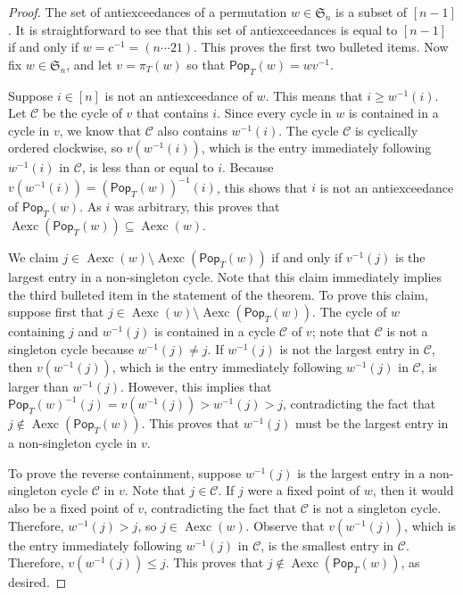 \documentclass[ALCO,ThmDefs,Unicode,epreuves]{cedram}
\newcommand{\pop}{\mathsf{Pop}}
\DeclareMathOperator{\Aexc}{Aexc}
\begin{document}
\begin{proof}
The set of antiexceedances of a permutation $w\in \mathfrak S_n$ is a subset of $[n-1]$. It is straightforward to see that this set of antiexceedances is equal to $[n-1]$ if and only if $w=c^{-1}=(n\cdots 21)$. This proves the first two bulleted items. Now fix $w\in \mathfrak S_n$, and let $v=\pi_T(w)$ so that $\pop_T(w)=wv^{-1}$.

Suppose $i\in[n]$ is not an antiexceedance of $w$. This means that $i\geq w^{-1}(i)$. Let $\mathcal C$ be the cycle of $v$ that contains $i$. Since every cycle in $w$ is contained in a cycle in $v$, we know that $\mathcal C$ also contains $w^{-1}(i)$. The cycle $\mathcal C$ is cyclically ordered clockwise, so $v(w^{-1}(i))$, which is the entry immediately following $w^{-1}(i)$ in $\mathcal C$, is less than or equal to $i$. Because $v(w^{-1}(i))=(\pop_T(w))^{-1}(i)$, this shows that $i$ is not an antiexceedance of $\pop_T(w)$. As $i$ was arbitrary, this proves that $\Aexc(\pop_T(w))\subseteq\Aexc(w)$. 

We claim $j\in\Aexc(w)\setminus\Aexc(\pop_T(w))$ if and only if $v^{-1}(j)$ is the largest entry in a non-singleton cycle. Note that this claim immediately implies the third bulleted item in the statement of the theorem. To prove this claim, suppose first that $j\in\Aexc(w)\setminus\Aexc(\pop_T(w))$. The cycle of $w$ containing $j$ and $w^{-1}(j)$ is contained in a cycle $\mathcal C$ of $v$; note that $\mathcal C$ is not a singleton cycle because $w^{-1}(j)\neq j$. If $w^{-1}(j)$ is not the largest entry in $\mathcal C$, then $v(w^{-1}(j))$, which is the entry immediately following $w^{-1}(j)$ in $\mathcal C$, is larger than $w^{-1}(j)$. However, this implies that $\pop_T(w)^{-1}(j)=v(w^{-1}(j))>w^{-1}(j)>j$, contradicting the fact that $j\not\in\Aexc(\pop_T(w))$. This proves that $w^{-1}(j)$ must be the largest entry in a non-singleton cycle in $v$. 

To prove the reverse containment, suppose $w^{-1}(j)$ is the largest entry in a non-singleton cycle $\mathcal C$ in $v$. Note that $j\in\mathcal C$. If $j$ were a fixed point of $w$, then it would also be a fixed point of $v$, contradicting the fact that $\mathcal C$ is not a singleton cycle. Therefore, $w^{-1}(j)>j$, so $j\in\Aexc(w)$. Observe that $v(w^{-1}(j))$, which is the entry immediately following $w^{-1}(j)$ in $\mathcal C$, is the smallest entry in $\mathcal C$. Therefore, $v(w^{-1}(j))\leq j$. This proves that $j\not\in\Aexc(\pop_T(w))$, as desired. 
\end{proof}
\end{document}
